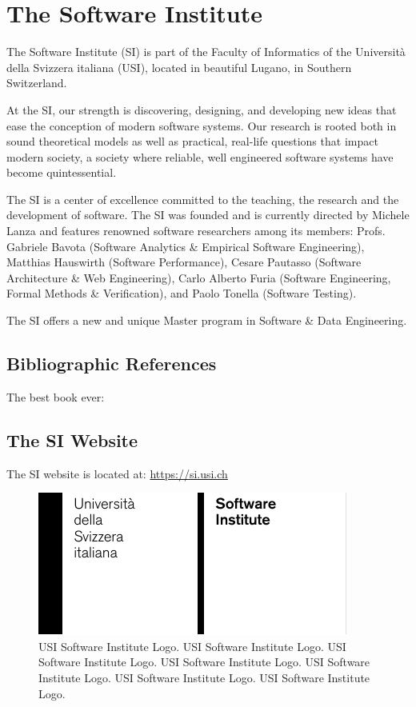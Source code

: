 
\section{The Software Institute}

The Software Institute (SI) is part of the Faculty of Informatics of the Universit\`a della Svizzera italiana (USI), located in beautiful Lugano, in Southern Switzerland.

At the SI, our strength is discovering, designing, and developing new ideas that ease the conception of modern software systems. Our research is rooted both in sound theoretical models as well as practical, real-life questions that impact modern society, a society where reliable, well engineered software systems have become quintessential.

The SI is a center of excellence committed to the teaching, the research and the development of software. The SI was founded and is currently directed by Michele Lanza and features renowned software researchers among its members: Profs. Gabriele Bavota (Software Analytics \& Empirical Software Engineering), Matthias Hauswirth (Software Performance), Cesare Pautasso (Software Architecture \& Web Engineering), Carlo Alberto Furia (Software Engineering, Formal Methods \& Verification), and Paolo Tonella (Software Testing).

The SI offers a new and unique Master program in Software \& Data Engineering.

\subsection{Bibliographic References}

The best book ever: \cite{Lanz2006a}

\subsection{The SI Website}

The SI website is located at: \url{https://si.usi.ch}

\begin{figure}[ht]
\centering
\includegraphics[width=0.75\linewidth]{auxiliary/Grid-System-USI-Software.pdf}
\caption{USI Software Institute Logo. USI Software Institute Logo. USI Software Institute Logo. USI Software Institute Logo. USI Software Institute Logo. USI Software Institute Logo. USI Software Institute Logo.}
\end{figure}

